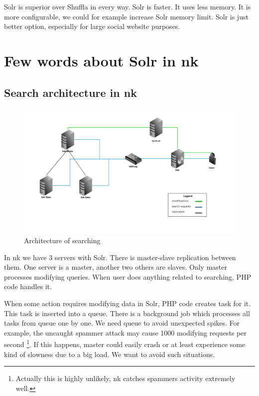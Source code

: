 \documentclass[10pt,a4paper]{article}
\begin{document}
\noindent{}

\bigskip

Solr is superior over Shuffla in every way. Solr is faster. It uses less memory. It is more configurable, we could for example increase Solr memory limit. Solr is just better option, especially for large social website purposes. 

\section{Few words about Solr in nk}

\subsection{Search architecture in nk}

\begin{figure}
\centering
  \includegraphics[width=12cm]{architektura_wyszukiwania}
  \caption{Architecture of searching}
  \label{fig:architektura_wyszukiwania}
\end{figure}

In nk we have 3 servers with Solr. There is master-slave replication between them. One server is a master, another two others are slaves. Only master processes modifying queries. When user does anything related to searching, PHP code handles it.

When some action requires modifying data in Solr, PHP code creates task for it. This task is inserted into a queue. There is a background job which processes all tasks from queue one by one. We need queue to avoid unexpected spikes. For example, the uncaught spammer attack may cause 1000 modifying requests per second \footnote{Actually this is highly unlikely, nk catches spammers activity extremely well.}. If this happens, master could easily crash or at least experience some kind of slowness due to a big load. We want to avoid such situations. 
\end{document}
